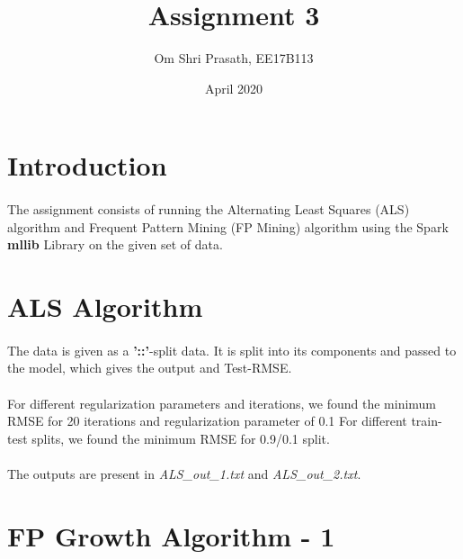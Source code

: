 \documentclass{article}
\title{Assignment 3}
\author{Om Shri Prasath, EE17B113}
\date{April 2020}
\begin{document}
\maketitle
\section*{Introduction}
\paragraph{}

The assignment consists of running the Alternating Least Squares (ALS) algorithm and Frequent Pattern Mining (FP Mining) algorithm using the Spark \textbf{mllib} Library on the given set of data.

\section*{ALS Algorithm}
\paragraph{}

 The data is given as a \textbf{'::'}-split data. It is split into its components and passed to the model, which gives the output and Test-RMSE.

 \paragraph{}

For different regularization parameters and iterations, we found the minimum RMSE for 20 iterations and regularization parameter of 0.1
For different train-test splits, we found the minimum RMSE for 0.9/0.1 split.

\paragraph{}

The outputs are present in \emph{ALS\_out\_1.txt} and \emph{ALS\_out\_2.txt}.

\section*{FP Growth Algorithm - 1}
\paragraph{}
\end{document}
